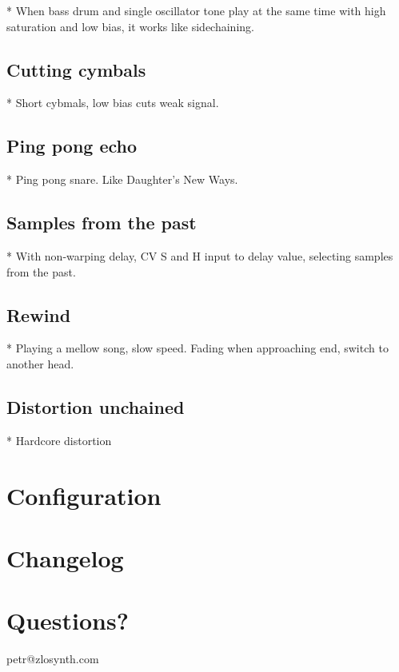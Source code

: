 \documentclass[11pt]{article}
\begin{document}
* When bass drum and single oscillator tone play at the same time with high
  saturation and low bias, it works like sidechaining.

\subsection{Cutting cymbals}

* Short cybmals, low bias cuts weak signal.

\subsection{Ping pong echo}

* Ping pong snare. Like Daughter's New Ways.

\subsection{Samples from the past}

* With non-warping delay, CV S and H input to delay value, selecting samples from
  the past.

\subsection{Rewind}

* Playing a mellow song, slow speed. Fading when approaching end, switch to another head.

\subsection{Distortion unchained}

* Hardcore distortion

\newpage





\noindent
\begin{minipage}[t]{0.3\textwidth}
\section{Configuration}
\end{minipage}%
\begin{minipage}{0.05\textwidth}
\phantom{ }
\end{minipage}%
\begin{minipage}[t]{0.3\textwidth}
\section{Changelog}
\end{minipage}
\begin{minipage}{0.05\textwidth}
\phantom{ }
\end{minipage}%
\begin{minipage}[t]{0.3\textwidth}
\section{Questions?}

\begin{center}
petr@zlosynth.com
\end{center}
\end{minipage}
\end{document}
